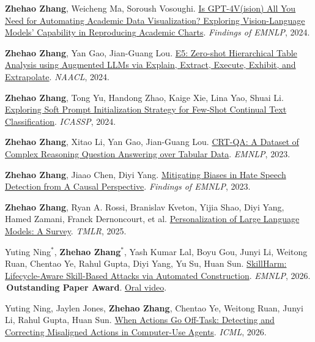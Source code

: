 \documentclass[a4paper,11pt]{article}
\newcommand{\paperaward}{\textcolor{awardgold}{\faTrophy}\,\textbf{Outstanding Paper Award}}
\begin{document}
{\begin{enumerate}[leftmargin=*, labelsep=0.5em, align=left, itemindent=0em, label={\textbf{[\arabic*]}}]
\item \textbf{Zhehao Zhang}, Weicheng Ma, Soroush Vosoughi. \href{https://aclanthology.org/2024.findings-emnlp.485/}{Is GPT-4V(ision) All You Need for Automating Academic Data Visualization? Exploring Vision-Language Models' Capability in Reproducing Academic Charts}. \textit{Findings of EMNLP}, 2024.

\item \textbf{Zhehao Zhang}, Yan Gao, Jian-Guang Lou. \href{https://aclanthology.org/2024.naacl-long.68/}{E5: Zero-shot Hierarchical Table Analysis using Augmented LLMs via Explain, Extract, Execute, Exhibit, and Extrapolate}. \textit{NAACL}, 2024.

\item \textbf{Zhehao Zhang}, Tong Yu, Handong Zhao, Kaige Xie, Lina Yao, Shuai Li. \href{https://ieeexplore.ieee.org/document/10448063}{Exploring Soft Prompt Initialization Strategy for Few-Shot Continual Text Classification}. \textit{ICASSP}, 2024.

\item \textbf{Zhehao Zhang}, Xitao Li, Yan Gao, Jian-Guang Lou. \href{https://aclanthology.org/2023.emnlp-main.132/}{CRT-QA: A Dataset of Complex Reasoning Question Answering over Tabular Data}. \textit{EMNLP}, 2023.

\item \textbf{Zhehao Zhang}, Jiaao Chen, Diyi Yang. \href{https://aclanthology.org/2023.findings-emnlp.440/}{Mitigating Biases in Hate Speech Detection from A Causal Perspective}. \textit{Findings of EMNLP}, 2023.

\item \textbf{Zhehao Zhang}, Ryan A. Rossi, Branislav Kveton, Yijia Shao, Diyi Yang, Hamed Zamani, Franck Dernoncourt, et al. \href{https://openreview.net/forum?id=tf6A9EYMo6}{Personalization of Large Language Models: A Survey}. \textit{TMLR}, 2025.

\item Yuting Ning$^*$, \textbf{Zhehao Zhang}$^*$, Yash Kumar Lal, Boyu Gou, Junyi Li, Weitong Ruan, Chentao Ye, Rahul Gupta, Diyi Yang, Yu Su, Huan Sun. \href{https://arxiv.org/abs/2606.02540}{SkillHarm: Lifecycle-Aware Skill-Based Attacks via Automated Construction}. \textit{EMNLP}, 2026. \paperaward. \href{https://drive.google.com/file/d/13qwpLEpJjJJVGGnf113K8bYIl8rAJFY7/view?usp=sharing}{Oral video}.

\item Yuting Ning, Jaylen Jones, \textbf{Zhehao Zhang}, Chentao Ye, Weitong Ruan, Junyi Li, Rahul Gupta, Huan Sun. \href{https://arxiv.org/abs/2602.08995}{When Actions Go Off-Task: Detecting and Correcting Misaligned Actions in Computer-Use Agents}. \textit{ICML}, 2026.


\end{enumerate}}
\end{document}
